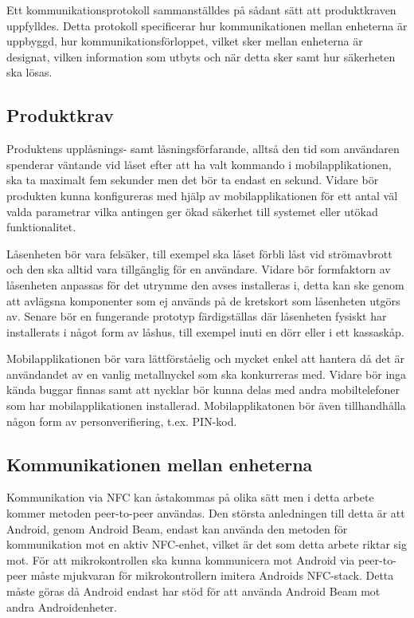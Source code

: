 \documentclass[11pt]{article}
\begin{document}
Ett kommunikationsprotokoll sammanställdes på sådant sätt att produktkraven uppfylldes. Detta protokoll  specificerar hur kommunikationen mellan enheterna är uppbyggd, hur kommunikationsförloppet, vilket sker mellan enheterna är designat, vilken information som utbyts och när detta sker samt hur säkerheten ska lösas.

\subsection{Produktkrav}
Produktens upplåsnings- samt låsningsförfarande, alltså den tid som användaren spenderar väntande vid låset efter att ha valt kommando i mobilapplikationen, ska ta maximalt fem sekunder men det bör ta endast en sekund. Vidare bör produkten kunna konfigureras med hjälp av mobilapplikationen för ett antal väl valda parametrar vilka antingen ger ökad säkerhet till systemet eller utökad funktionalitet.

Låsenheten bör vara felsäker, till exempel ska låset förbli låst vid strömavbrott och den ska alltid vara tillgänglig för en användare. Vidare bör formfaktorn av låsenheten anpassas för det utrymme den avses installeras i, detta kan ske genom att avlägsna komponenter som ej används på de kretskort som låsenheten utgörs av. Senare bör en fungerande prototyp färdigställas där låsenheten fysiskt har installerats i något form av låshus, till exempel inuti en dörr eller i ett kassaskåp.

Mobilapplikationen bör vara lättförståelig och mycket enkel att hantera då det är användandet av en vanlig metallnyckel som ska konkurreras med. Vidare bör inga kända buggar finnas samt att nycklar bör kunna delas med andra mobiltelefoner som har mobilapplikationen installerad. Mobilapplikatonen bör även tillhandhålla någon form av personverifiering, t.ex. PIN-kod.

\subsection{Kommunikationen mellan enheterna}
Kommunikation via NFC kan åstakommas på olika sätt men i detta arbete kommer metoden peer-to-peer användas. Den största anledningen till detta är att Android, genom Android Beam, endast kan använda den metoden för kommunikation mot en aktiv NFC-enhet, vilket är det som detta arbete riktar sig mot. För att mikrokontrollen ska kunna kommunicera mot Android via peer-to-peer måste mjukvaran för mikrokontrollern imitera Androids NFC-stack. Detta måste göras då Android endast har stöd för att använda Android Beam mot andra Androidenheter.
\end{document}
